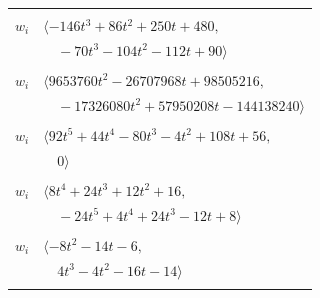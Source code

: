 \documentclass[11pt]{article}
\begin{document}
\begin{longtable}{@{}ll@{}}
\addlinespace[2pt]
\multicolumn{2}{@{}p{0.97\textwidth}@{}}{$i=32$, $D_i=62$, $\rho_{ij}$: $2{:}2, \allowbreak 6{:}2, \allowbreak 14{:}2, \allowbreak 31{:}1, \allowbreak 39{:}1$}\\
$w_i$ & $\langle -146t^{3}+86t^{2}+250t+480,$\\
 & $\quad -70t^{3}-104t^{2}-112t+90\rangle$\\
\addlinespace[2pt]
\multicolumn{2}{@{}p{0.97\textwidth}@{}}{$i=33$, $D_i=32$, $\rho_{ij}$: $1{:}1, \allowbreak 3{:}2, \allowbreak 5{:}2, \allowbreak 8{:}2, \allowbreak 10{:}2, \allowbreak 17{:}1, \allowbreak 18{:}1, \allowbreak 19{:}2, \allowbreak 21{:}2, \allowbreak 24{:}1, \allowbreak 26{:}1, \allowbreak 34{:}1, \allowbreak 36{:}2, \allowbreak 39{:}2, \allowbreak 46{:}1, \allowbreak 55{:}1, \allowbreak 56{:}2, \allowbreak 57{:}2, \allowbreak 59{:}2, \allowbreak 60{:}1, \allowbreak 62{:}2$}\\
$w_i$ & $\langle 9653760t^{2}-26707968t+98505216,$\\
 & $\quad -17326080t^{2}+57950208t-144138240\rangle$\\
\addlinespace[2pt]
\multicolumn{2}{@{}p{0.97\textwidth}@{}}{$i=34$, $D_i=4$, $\rho_{ij}$: $2{:}2, \allowbreak 16{:}1, \allowbreak 18{:}2, \allowbreak 26{:}2, \allowbreak 33{:}2, \allowbreak 37{:}2, \allowbreak 40{:}2, \allowbreak 56{:}1, \allowbreak 57{:}1$}\\
$w_i$ & $\langle 92t^{5}+44t^{4}-80t^{3}-4t^{2}+108t+56,$\\
 & $\quad 0\rangle$\\
\addlinespace[2pt]
\multicolumn{2}{@{}p{0.97\textwidth}@{}}{$i=35$, $D_i=4$, $\rho_{ij}$: $0{:}2, \allowbreak 4{:}2, \allowbreak 13{:}1, \allowbreak 16{:}1, \allowbreak 18{:}1, \allowbreak 21{:}2, \allowbreak 30{:}1, \allowbreak 50{:}1, \allowbreak 52{:}2, \allowbreak 55{:}2$}\\
$w_i$ & $\langle 8t^{4}+24t^{3}+12t^{2}+16,$\\
 & $\quad -24t^{5}+4t^{4}+24t^{3}-12t+8\rangle$\\
\addlinespace[2pt]
\multicolumn{2}{@{}p{0.97\textwidth}@{}}{$i=36$, $D_i=2$, $\rho_{ij}$: $8{:}1, \allowbreak 14{:}1, \allowbreak 24{:}1, \allowbreak 33{:}1, \allowbreak 44{:}1, \allowbreak 52{:}2, \allowbreak 57{:}1$}\\
$w_i$ & $\langle -8t^{2}-14t-6,$\\
 & $\quad 4t^{3}-4t^{2}-16t-14\rangle$\\
\addlinespace[2pt]
\multicolumn{2}{@{}p{0.97\textwidth}@{}}{$i=37$, $D_i=8$, $\rho_{ij}$: $3{:}2, \allowbreak 5{:}2, \allowbreak 10{:}2, \allowbreak 19{:}2, \allowbreak 22{:}1, \allowbreak 24{:}1, \allowbreak 25{:}1, \allowbreak 28{:}1, \allowbreak 30{:}1, \allowbreak 34{:}1, \allowbreak 42{:}1, \allowbreak 44{:}2, \allowbreak 53{:}1$}\\

\end{longtable}
\end{document}
